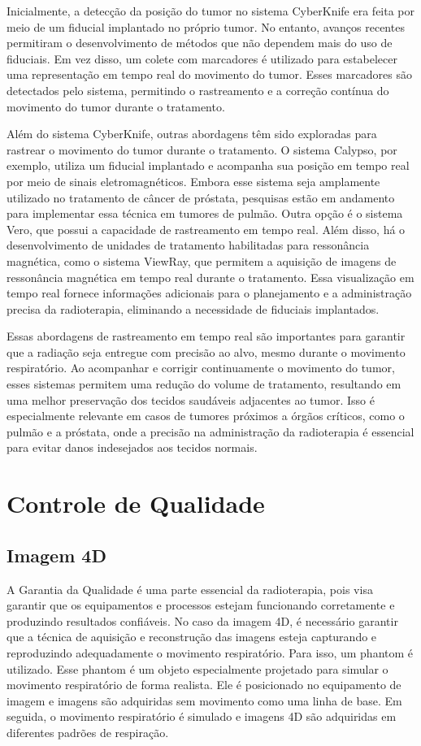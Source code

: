 \documentclass[11pt,a4paper]{article}
\newcounter{exemplo}
\begin{document}
	Inicialmente, a detecção da posição do tumor no sistema CyberKnife era feita por meio de um fiducial implantado no próprio tumor. No entanto, avanços recentes permitiram o desenvolvimento de métodos que não dependem mais do uso de fiduciais. Em vez disso, um colete com marcadores é utilizado para estabelecer uma representação em tempo real do movimento do tumor. Esses marcadores são detectados pelo sistema, permitindo o rastreamento e a correção contínua do movimento do tumor durante o tratamento.

	Além do sistema CyberKnife, outras abordagens têm sido exploradas para rastrear o movimento do tumor durante o tratamento. O sistema Calypso, por exemplo, utiliza um fiducial implantado e acompanha sua posição em tempo real por meio de sinais eletromagnéticos. Embora esse sistema seja amplamente utilizado no tratamento de câncer de próstata, pesquisas estão em andamento para implementar essa técnica em tumores de pulmão. Outra opção é o sistema Vero, que possui a capacidade de rastreamento em tempo real. Além disso, há o desenvolvimento de unidades de tratamento habilitadas para ressonância magnética, como o sistema ViewRay, que permitem a aquisição de imagens de ressonância magnética em tempo real durante o tratamento. Essa visualização em tempo real fornece informações adicionais para o planejamento e a administração precisa da radioterapia, eliminando a necessidade de fiduciais implantados.
	
	Essas abordagens de rastreamento em tempo real são importantes para garantir que a radiação seja entregue com precisão ao alvo, mesmo durante o movimento respiratório. Ao acompanhar e corrigir continuamente o movimento do tumor, esses sistemas permitem uma redução do volume de tratamento, resultando em uma melhor preservação dos tecidos saudáveis adjacentes ao tumor. Isso é especialmente relevante em casos de tumores próximos a órgãos críticos, como o pulmão e a próstata, onde a precisão na administração da radioterapia é essencial para evitar danos indesejados aos tecidos normais.

\section{Controle de Qualidade}

\subsection*{Imagem 4D}

	A Garantia da Qualidade é uma parte essencial da radioterapia, pois visa garantir que os equipamentos e processos estejam funcionando corretamente e produzindo resultados confiáveis. No caso da imagem 4D, é necessário garantir que a técnica de aquisição e reconstrução das imagens esteja capturando e reproduzindo adequadamente o movimento respiratório. Para isso, um phantom é utilizado. Esse phantom é um objeto especialmente projetado para simular o movimento respiratório de forma realista. Ele é posicionado no equipamento de imagem e imagens são adquiridas sem movimento como uma linha de base. Em seguida, o movimento respiratório é simulado e imagens 4D são adquiridas em diferentes padrões de respiração.
\end{document}
